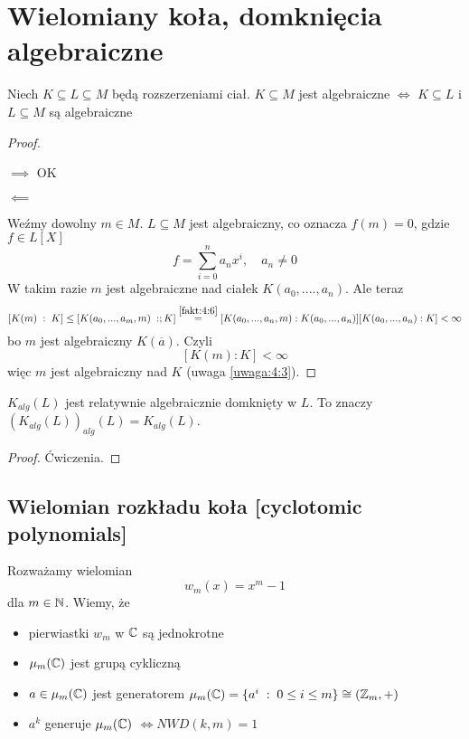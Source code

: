 
\section{Wielomiany koła, domknięcia algebraiczne}

\begin{remark}
        Niech $K\subseteq L\subseteq M$ będą rozszerzeniami ciał. $K\subseteq M$ jest algebraiczne $\iff$ $K\subseteq L$ i $L\subseteq M$ są algebraiczne
\end{remark}

\begin{proof}
$ $\newline

$\implies$ OK

$\impliedby$

Weźmy dowolny $m\in M$. $L\subseteq M$ jest algebraiczny, co oznacza $f(m)=0$, gdzie $f\in L[X]$
$$f=\sum\limits_{i=0}^na_nx^i,\quad a_n\neq 0$$
W takim razie $m$ jest algebraiczne nad ciałek $K(a_0,....,a_n)$. Ale teraz
$$[K(m)\;:\;K]\leq [K(a_0,...,a_m,m)\;:;K]\overset{\ref{fakt:4:6}}{=}[K(a_0,...,a_n,m):K(a_0,...,a_n)][K(a_0,...,a_n):K]<\infty$$
bo $m$ jest algebraiczny $K(\overline a)$. Czyli
$$[K(m):K]<\infty$$
więc $m$ jest algebraiczny nad $K$ (uwaga \ref{uwaga:4:3}). 
\end{proof}
\begin{remark}[$(K_{alg}(L))_{alg}(L)=K_{alg}(L)$]
    $K_{alg}(L)$ jest relatywnie algebraicznie domknięty w $L$. To znaczy $(K_{alg}(L))_{alg}(L)=K_{alg}(L)$. 
\end{remark}

\begin{proof}
Ćwiczenia.
\end{proof}

\subsection{Wielomian rozkładu koła [cyclotomic polynomials]}

Rozważamy wielomian
$$w_m(x)=x^m-1$$
dla $m\in\mathbb{N}$. Wiemy, że
\begin{itemize}
    \item pierwiastki $w_m$ w $\mathbb{C}$ są jednokrotne
    \item $\mu_m(\mathbb{C})$ jest grupą cykliczną
    \item $a\in\mu_m(\mathbb{C})$ jest generatorem $\mu_m(\mathbb{C})=\{a^i\;:\;0\leq i\leq m\}\cong(\mathbb{Z}_m,+)$
    \item $a^k$ generuje $\mu_m(\mathbb{C})$ $\iff NWD(k, m)=1$
\end{itemize}

